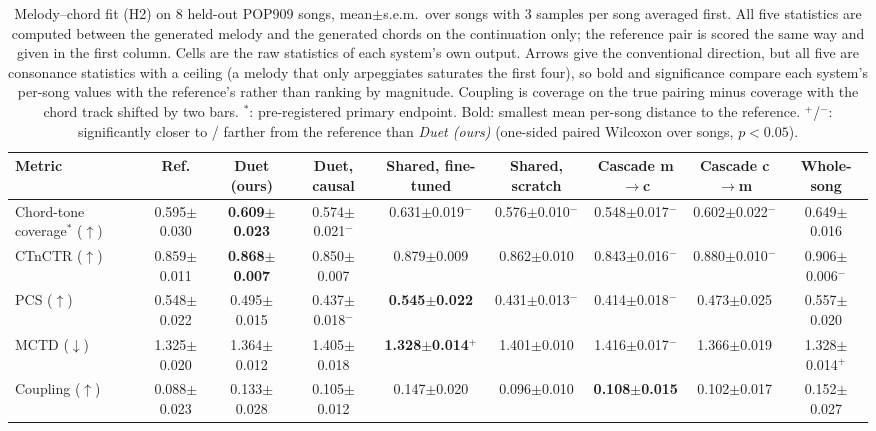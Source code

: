 \begin{table}[t]
\caption{Melody--chord fit (H2) on 8 held-out POP909 songs, mean$\pm$s.e.m.\ over songs with 3 samples per song averaged first. All five statistics are computed between the generated melody and the generated chords on the continuation only; the reference pair is scored the same way and given in the first column. Cells are the raw statistics of each system's own output. Arrows give the conventional direction, but all five are consonance statistics with a ceiling (a melody that only arpeggiates saturates the first four), so bold and significance compare each system's per-song values with the reference's rather than ranking by magnitude. Coupling is coverage on the true pairing minus coverage with the chord track shifted by two bars. $^*$: pre-registered primary endpoint. Bold: smallest mean per-song distance to the reference. $^{\mathrm{+}}$/$^{\mathrm{-}}$: significantly closer to / farther from the reference than \emph{Duet (ours)} (one-sided paired Wilcoxon over songs, $p<0.05$).}
\begin{center}
\footnotesize
\setlength{\tabcolsep}{4pt}
\begin{tabular}{|l|c|c|c|c|c|c|c|c|}
\hline
\textbf{Metric} & \textbf{Ref.} & \textbf{Duet (ours)} & \textbf{Duet, causal} & \textbf{Shared, fine-tuned} & \textbf{Shared, scratch} & \textbf{Cascade m$\to$c} & \textbf{Cascade c$\to$m} & \textbf{Whole-song} \\
\hline
Chord-tone coverage$^*$ ($\uparrow$) & 0.595$\pm$0.030 & \textbf{0.609$\pm$0.023} & 0.574$\pm$0.021$^{\mathrm{-}}$ & 0.631$\pm$0.019$^{\mathrm{-}}$ & 0.576$\pm$0.010$^{\mathrm{-}}$ & 0.548$\pm$0.017$^{\mathrm{-}}$ & 0.602$\pm$0.022$^{\mathrm{-}}$ & 0.649$\pm$0.016 \\
CTnCTR ($\uparrow$) & 0.859$\pm$0.011 & \textbf{0.868$\pm$0.007} & 0.850$\pm$0.007 & 0.879$\pm$0.009 & 0.862$\pm$0.010 & 0.843$\pm$0.016$^{\mathrm{-}}$ & 0.880$\pm$0.010$^{\mathrm{-}}$ & 0.906$\pm$0.006$^{\mathrm{-}}$ \\
PCS ($\uparrow$) & 0.548$\pm$0.022 & 0.495$\pm$0.015 & 0.437$\pm$0.018$^{\mathrm{-}}$ & \textbf{0.545$\pm$0.022} & 0.431$\pm$0.013$^{\mathrm{-}}$ & 0.414$\pm$0.018$^{\mathrm{-}}$ & 0.473$\pm$0.025 & 0.557$\pm$0.020 \\
MCTD ($\downarrow$) & 1.325$\pm$0.020 & 1.364$\pm$0.012 & 1.405$\pm$0.018 & \textbf{1.328$\pm$0.014}$^{\mathrm{+}}$ & 1.401$\pm$0.010 & 1.416$\pm$0.017$^{\mathrm{-}}$ & 1.366$\pm$0.019 & 1.328$\pm$0.014$^{\mathrm{+}}$ \\
Coupling ($\uparrow$) & 0.088$\pm$0.023 & 0.133$\pm$0.028 & 0.105$\pm$0.012 & 0.147$\pm$0.020 & 0.096$\pm$0.010 & \textbf{0.108$\pm$0.015} & 0.102$\pm$0.017 & 0.152$\pm$0.027 \\
\hline
\end{tabular}
\label{tab:h2}
\end{center}
\end{table}
